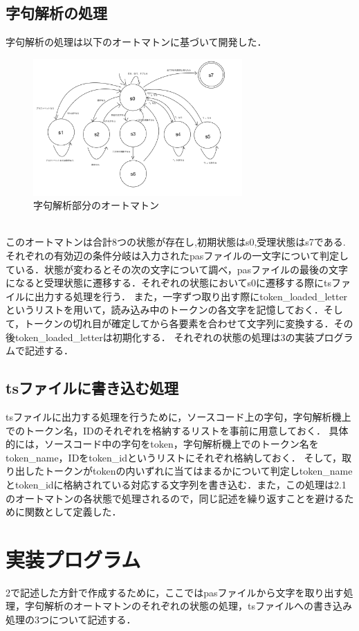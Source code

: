 \documentclass[dvipdfmx]{jarticle}
\begin{document}
\subsection{字句解析の処理}
字句解析の処理は以下のオートマトンに基づいて開発した．
\begin{figure}[h]
    \centering
    \includegraphics[width = 8cm, angle = -90]{automaton.png}
    \caption{字句解析部分のオートマトン}
\end{figure}
\\このオートマトンは合計8つの状態が存在し,初期状態はs0,受理状態はs7である.それぞれの有効辺の条件分岐は入力されたpasファイルの一文字について判定している．状態が変わるとその次の文字について調べ，pasファイルの最後の文字になると受理状態に遷移する．それぞれの状態においてs0に遷移する際にtsファイルに出力する処理を行う．
また，一字ずつ取り出す際にtoken\_loaded\_letterというリストを用いて，読み込み中のトークンの各文字を記憶しておく．そして，トークンの切れ目が確定してから各要素を合わせて文字列に変換する．その後token\_loaded\_letterは初期化する．
それぞれの状態の処理は3の実装プログラムで記述する．
\subsection{tsファイルに書き込む処理}
tsファイルに出力する処理を行うために，ソースコード上の字句，字句解析機上でのトークン名，IDのそれぞれを格納するリストを事前に用意しておく．\cite{1}
具体的には，ソースコード中の字句をtoken，字句解析機上でのトークン名をtoken\_name，IDをtoken\_idというリストにそれぞれ格納しておく．
そして，取り出したトークンがtokenの内いずれに当てはまるかについて判定しtoken\_nameとtoken\_idに格納されている対応する文字列を書き込む．また，この処理は2.1のオートマトンの各状態で処理されるので，同じ記述を繰り返すことを避けるために関数として定義した．
\section{実装プログラム}
2で記述した方針で作成するために，ここではpasファイルから文字を取り出す処理，字句解析のオートマトンのそれぞれの状態の処理，tsファイルへの書き込み処理の3つについて記述する．
\end{document}

